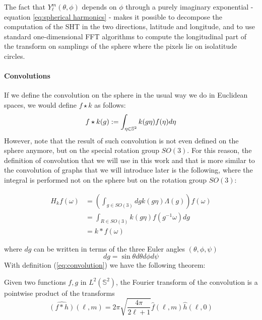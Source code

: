 The fact that $Y_\ell^m(\theta, \phi)$ depends on $\phi$ through a purely imaginary exponential - equation \ref{eq:spherical harmonics} - makes it possible to decompose the computation of the SHT in the two directions, latitude and longitude, and to use standard one-dimensional FFT algorithms to compute the longitudinal part of the transform on samplings of the sphere where the pixels lie on isolatitude circles.

\paragraph{Convolutions}
If we define the convolution on the sphere in the usual way we do in Euclidean spaces, we would define $f\star k$ as follows:
\begin{equation} 
f\star k(g) := \int_{\eta \in \mathbb S^2} k(g \eta) f(\eta) d\eta\\ 
\end{equation}
 However, note that the result of such convolution is not even defined on the sphere anymore, but on the special rotation group $SO(3)$. For this reason, the definition of convolution that we will use in this work and that is more similar to the convolution of graphs that we will introduce later is the following, where the integral is performed not on the sphere but on the rotation group $SO(3)$:

\begin{equation}\label{eq:convolution}
	\begin{aligned} H_{k} f(\omega) &=\left(\int_{g \in S O(3)} d g k(g \eta) \Lambda(g)\right) f(\omega) \\ &=\int_{R \in S O(3)} k(g \eta) f\left(g^{-1} \omega\right) d g \\ &=k * f(\omega) \end{aligned}
\end{equation}

where $dg$ can be written in terms of the three Euler angles $(\theta, \phi, \psi)$ 
$$dg=\sin\theta d\theta d\phi d\psi$$
With definition (\ref{eq:convolution}) we have the following theorem:
\vspace{0.5cm}
\begin{theorem}
	Given two functions $f, g$ in $L^2(\mathbb S^2)$, the Fourier transform of the convolution is a pointwise product of the transforms
$$
\hat{(f * h)}(\ell, m)=2 \pi \sqrt{\frac{4 \pi}{2 \ell+1}} \hat{f}(\ell, m) \hat{h}(\ell, 0)
$$
\end{theorem}
\vspace{0.5cm}

